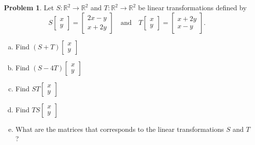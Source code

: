 \documentclass[10pt]{article}
\theoremstyle{definition}
\newtheorem{problem}[theorem]{Problem}
\newcommand{\1}[1]{\textbf{1}_{\left[#1\right]}} %
\def\R{\mathbb{R}} %
\begin{document}
\begin{problem}
  Let $S:\R^{2}\to \R^{2}$ and $T: \R^{2}\to \R^{2}$ be linear transformations
  defined by
  \begin{equation*}
    S
    \begin{bmatrix}
      x\\y
    \end{bmatrix}
    =
    \begin{bmatrix}
      2x-y\\
      x+2y
    \end{bmatrix}
    \quad \text{and} \quad
    T
    \begin{bmatrix}
      x\\y
    \end{bmatrix}
    =
    \begin{bmatrix}
      x+2y\\x-y
    \end{bmatrix}.
  \end{equation*}
  \begin{enumerate}[(a)]
    \item Find $(S+T)
    \begin{bmatrix}
      x\\y
    \end{bmatrix}
    $
    \item Find $(S-4T)
    \begin{bmatrix}
      x\\y
    \end{bmatrix}
    $
    \item Find $ST
    \begin{bmatrix}
      x\\y
    \end{bmatrix}
    $
    \item Find $TS
    \begin{bmatrix}
      x\\y
    \end{bmatrix}
    $
    \item What are the matrices that corresponds to the linear transformations
    $S$ and $T$?
    
  \end{enumerate}
\end{problem}
\end{document}
